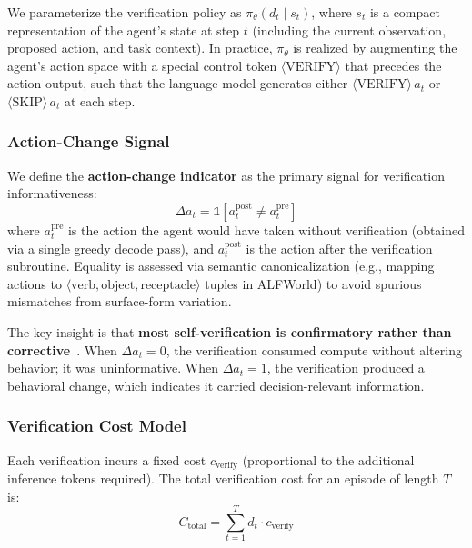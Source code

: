 We parameterize the verification policy as $\pi_\theta(d_t \mid s_t)$, where $s_t$ is a compact representation of the agent's state at step $t$ (including the current observation, proposed action, and task context). In practice, $\pi_\theta$ is realized by augmenting the agent's action space with a special control token $\langle\text{VERIFY}\rangle$ that precedes the action output, such that the language model generates either $\langle\text{VERIFY}\rangle\, a_t$ or $\langle\text{SKIP}\rangle\, a_t$ at each step.

\subsubsection{Action-Change Signal}

We define the \textbf{action-change indicator} as the primary signal for verification informativeness:
\begin{equation}
\Delta a_t = \mathbb{1}\left[a_t^{\text{post}} \neq a_t^{\text{pre}}\right]
\label{eq:action-change}
\end{equation}
where $a_t^{\text{pre}}$ is the action the agent would have taken without verification (obtained via a single greedy decode pass), and $a_t^{\text{post}}$ is the action after the verification subroutine. Equality is assessed via semantic canonicalization (e.g., mapping actions to $\langle \text{verb}, \text{object}, \text{receptacle} \rangle$ tuples in ALFWorld) to avoid spurious mismatches from surface-form variation.

The key insight is that \textbf{most self-verification is confirmatory rather than corrective}~\cite{self-verification-dilemma-2026}. When $\Delta a_t = 0$, the verification consumed compute without altering behavior; it was uninformative. When $\Delta a_t = 1$, the verification produced a behavioral change, which indicates it carried decision-relevant information.

\subsubsection{Verification Cost Model}

Each verification incurs a fixed cost $c_{\text{verify}}$ (proportional to the additional inference tokens required). The total verification cost for an episode of length $T$ is:
\begin{equation}
C_{\text{total}} = \sum_{t=1}^{T} d_t \cdot c_{\text{verify}}
\label{eq:total-cost}
\end{equation}


